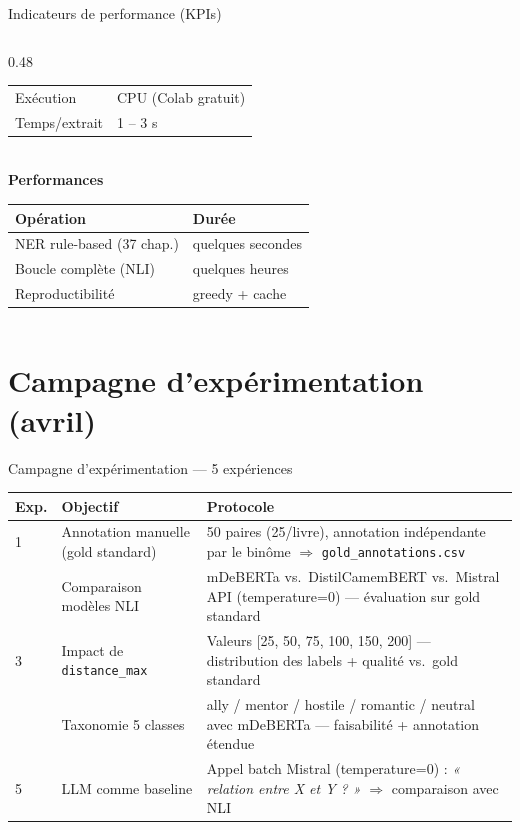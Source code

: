 \documentclass[aspectratio=169]{beamer}
\begin{document}
\begin{frame}{Indicateurs de performance (KPIs)}
\begin{columns}[T]
\begin{column}{0.48\textwidth}
\begin{tabular}{lp{3.5cm}}
        Exécution     & CPU (Colab gratuit) \\
        Temps/extrait & 1 -- 3 s \\
        \bottomrule
      \end{tabular}
      \vspace{4pt}\\
      \textbf{Performances}\\[2pt]
      \begin{tabular}{lp{3cm}}
        \toprule
        Opération & Durée \\
        \midrule
        NER rule-based (37 chap.) & quelques secondes \\
        Boucle complète (NLI)     & quelques heures \\
        Reproductibilité          & greedy + cache \\
        \bottomrule
      \end{tabular}
    \end{column}
  \end{columns}
\end{frame}

\section{Campagne d'expérimentation (avril)}

\begin{frame}{Campagne d'expérimentation --- 5 expériences}
  \footnotesize
  \setlength{\tabcolsep}{4pt}
  \renewcommand{\arraystretch}{1.25}
  \begin{tabularx}{\textwidth}{>{\centering\arraybackslash}p{0.6cm}
                               p{3.4cm}
                               X}
    \toprule
    \textbf{Exp.} & \textbf{Objectif} & \textbf{Protocole} \\
    \midrule
    \rowcolor{rowgray}
    1 & Annotation manuelle (gold standard) &
        50 paires (25/livre), annotation indépendante par le binôme $\Rightarrow$ \texttt{gold\_annotations.csv} \\
    2 & Comparaison modèles NLI &
        mDeBERTa vs.\ DistilCamemBERT vs.\ Mistral API (temperature=0) --- évaluation sur gold standard \\
    \rowcolor{rowgray}
    3 & Impact de \texttt{distance\_max} &
        Valeurs [25, 50, 75, 100, 150, 200] --- distribution des labels + qualité vs.\ gold standard \\
    4 & Taxonomie 5 classes &
        ally / mentor / hostile / romantic / neutral avec mDeBERTa --- faisabilité + annotation étendue \\
    \rowcolor{rowgray}
    5 & LLM comme baseline &
        Appel batch Mistral (temperature=0) : \emph{« relation entre X et Y ? »} $\Rightarrow$ comparaison avec NLI \\
    \bottomrule
  \end{tabularx}
\end{frame}
\end{document}
